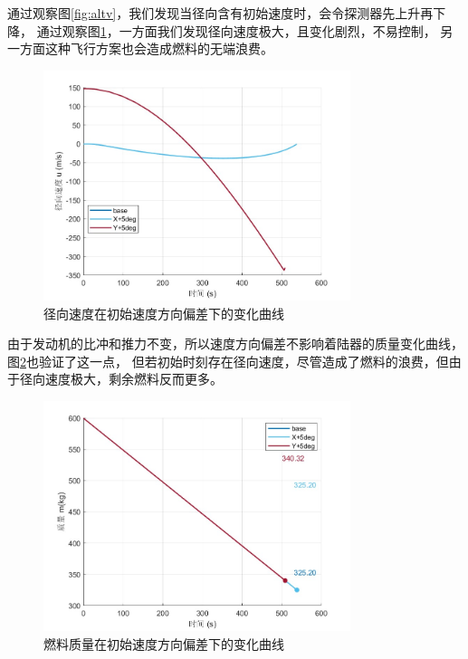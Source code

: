 \documentclass[12pt,a4paper]{article}
\begin{document}
通过观察图\ref{fig:altv}，我们发现当径向含有初始速度时，会令探测器先上升再下降，
通过观察图\ref{fig:uv}，一方面我们发现径向速度极大，且变化剧烈，不易控制，
另一方面这种飞行方案也会造成燃料的无端浪费。

\begin{figure}[H]
\centering
\includegraphics[width=0.8\textwidth]{figures/u_VelDir.jpg}
\caption{径向速度在初始速度方向偏差下的变化曲线}
\label{fig:uv}
\end{figure}

由于发动机的比冲和推力不变，所以速度方向偏差不影响着陆器的质量变化曲线，图\ref{fig:mv}也验证了这一点，
但若初始时刻存在径向速度，尽管造成了燃料的浪费，但由于径向速度极大，剩余燃料反而更多。

\begin{figure}[H]
\centering
\includegraphics[width=0.8\textwidth]{figures/m_VelDir.jpg}
\caption{燃料质量在初始速度方向偏差下的变化曲线}
\label{fig:mv}
\end{figure}
\end{document}
